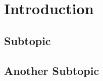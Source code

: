 \section{Introduction}

\blindtext[3]

\subsection{Subtopic}

\blindtext

\subsection{Another Subtopic}

\blindtext[3]
